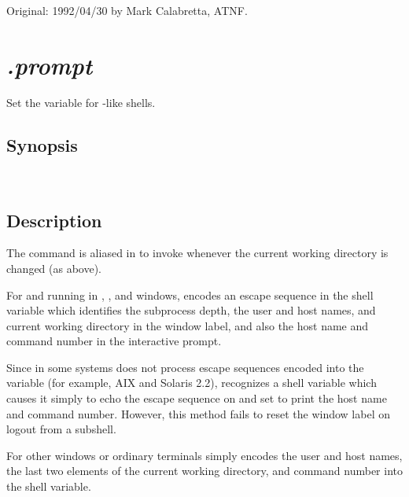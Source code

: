 Original: 1992/04/30 by Mark Calabretta, ATNF.


\newpage
\section{\textit{.prompt}}
\label{.prompt}

Set the  variable for -like shells.

\subsection*{Synopsis}

\begin{synopsis}
   \\
\end{synopsis}

\subsection*{Description}

The  command is aliased in  to invoke
 whenever the current working directory is changed (as above).

For  and  running in ,
, and  windows,  encodes an
escape sequence in the  shell variable which identifies the
subprocess depth, the user and host names, and current working directory in
the window label, and also the host name and command number in the interactive
prompt.

Since  in some systems does not process escape sequences encoded
into the  variable (for example, AIX and Solaris 2.2),
 recognizes a shell variable  which causes
it simply to echo the escape sequence on  and set 
to print the host name and command number.  However, this method fails to
reset the window label on logout from a subshell.

For other windows or ordinary terminals  simply encodes the user
and host names, the last two elements of the current working directory, and
command number into the  shell variable.

